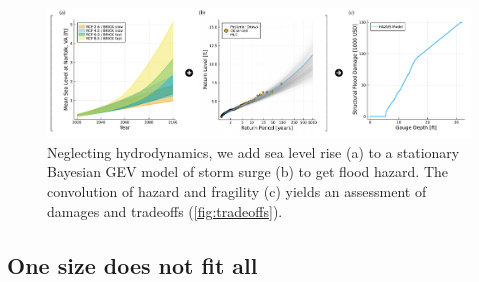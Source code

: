 \documentclass[12pt]{article}
\begin{document}
\begin{figure}
    \centering
    \includegraphics[width=6in]{hazard-tradeoffs.pdf}
    \caption{
        Neglecting hydrodynamics, we add sea level rise (a) to a stationary Bayesian GEV model of storm surge (b) to get flood hazard.
        The convolution of hazard and fragility (c) yields an assessment of damages and tradeoffs (\cref{fig:tradeoffs}).
    }
\end{figure}

\subsection{One size does not fit all}
\end{document}
